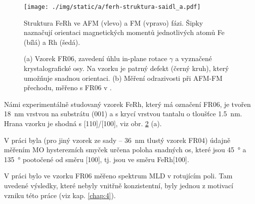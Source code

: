 \begin{figure}[htbp]
    \centering
    \texttt{[image: ./img/static/a/ferh-struktura-saidl\_a.pdf]}
    \caption{Struktura FeRh ve AFM (vlevo) a FM (vpravo) fázi.
        Šipky naznačují orientaci magnetických momentů jednotlivých atomů Fe (bílá) a Rh (šedá). \cite{saidlInvestigationMagnetostructuralPhase2016}}
    \label{fig:ferh-struktura}
\end{figure}

\begin{figure}[htbp]
    \centering
    
    \caption{(a) Vzorek FR06, zavedení úhlu in-plane rotace $\gamma$ a vyznačené krystalografické osy.
    Na vzorku je patrný defekt (černý kruh), který umožňuje snadnou orientaci. (b) Měření odrazivosti při AFM-FM přechodu, měřeno s FR06 v \cite{kubascikMagnetooptickeStudiumAntiferomagnetickych2019}.}
    \label{fig:vzorek-ferh}
\end{figure}

Námi experimentálně studovaný vzorek FeRh, který má označení FR06, je tvořen \SI{18}{\nano\meter} vrstvou  na substrátu (001) a s krycí vrstvou tantalu o tloušťce \SI{1.5}{\nano\meter}.
Hrana vzorku je shodná s [110]/[100], viz obr. \ref{fig:vzorek-ferh} (a).

V práci \cite{brajerLaserovaSpektroskopieMaterialu2015} byla (pro jiný vzorek ze sady -- \SI{36}{\nano\meter} tlustý vzorek FR04) údajně měřením MO hysterezních smyček určena poloha snadných os, které jsou \SI{45}{\degree} a \SI{135}{\degree} pootočené od směru [100], tj. jsou ve směru FeRh[100].

V práci \cite{kubascikMagnetooptickeStudiumAntiferomagnetickych2019} bylo ve vzorku FR06 měřeno spektrum MLD v rotujícím poli.
Tam uvedené výsledky, které nebyly vnitřně konzistentní, byly jednou z motivací vzniku této práce (viz kap. \ref{chap:4}).
